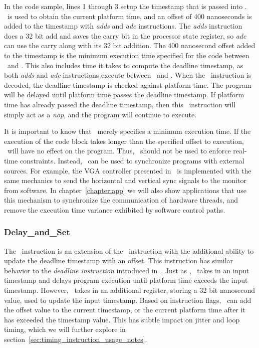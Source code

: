 In the code sample, lines 1 through 3 setup the timestamp that is passed into \delayuntil. 
\Gettime\ is used to obtain the current platform time, and an offset of 400 nanoseconds is added to the timestamp with \emph{adds} and \emph{adc} instructions.
The \emph{adds} instruction does a 32 bit add and saves the carry bit in the processor state register, so \emph{adc} can use the carry along with its 32 bit addition.
The 400 nanosecond offset added to the timestamp is the minimum execution time specified for the code between \gettime\ and \delayuntil.
This also includes time it takes to compute the deadline timestamp, as both \emph{adds} and \emph{adc} instructions execute between \gettime\ and \delayuntil.
When the \delayuntil\ instruction is decoded, the deadline timestamp is checked against platform time.
The program will be delayed until platform time passes the deadline timestamp. 
If platform time has already passed the deadline timestamp, then this \delayuntil\ instruction will simply act as a \emph{nop}, and the program will continue to execute. 

It is important to know that \delayuntil\ merely specifies a minimum execution time.
If the execution of the code block takes longer than the specified offset to execution, \delayuntil\ will have no effect on the program.
Thus, \delayuntil\ should not be used to enforce real-time constraints.
Instead, \delayuntil\ can be used to synchronize programs with external sources. 
For example, the VGA controller presented in~\cite{ip2006processor} is implemented with the same mechanics to send the horizontal and vertical sync signals to the monitor from software.
In chapter~\ref{chapter:app} we will also show applications that use this mechanism to synchronize the communication of hardware threads, and remove the execution time variance exhibited by software control paths.  
    
\subsubsection{Delay\_and\_Set}
The \delayandset\ instruction is an extension of the \delayuntil\ instruction with the additional ability to update the deadline timestamp with an offset. 
This instruction has similar behavior to the \emph{deadline instruction} introduced in~\cite{ip2006processor}.
Just as \delayuntil, \delayandset\ takes in an input timestamp and delays program execution until platform time exceeds the input timestamp. 
However, \delayandset\ takes in an additional register, storing a 32 bit nanosecond value, used to update the input timestamp.
Based on instruction flags, \delayandset\ can add the offset value to the current timestamp, or the current platform time after it has exceeded the timestamp value. 
This has subtle impact on jitter and loop timing, which we will further explore in section~\ref{sec:timing_instruction_usage_notes}.  

